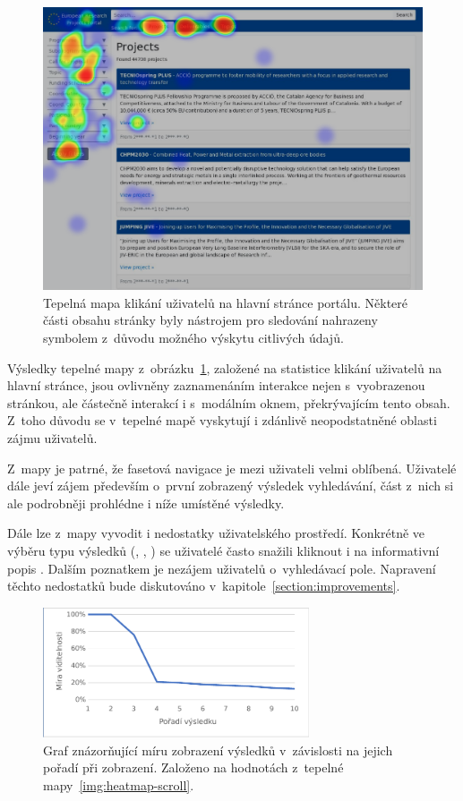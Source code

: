\begin{figure}[H]
	\centering
	\includegraphics[width=\textwidth]{obrazky-figures/heatmap.png}
	\caption{Tepelná mapa klikání uživatelů na hlavní stránce portálu. Některé části obsahu stránky byly nástrojem pro sledování nahrazeny symbolem \uv{*} z~důvodu možného výskytu citlivých údajů.}
	\label{img:heatmap}
\end{figure}

Výsledky tepelné mapy z~obrázku~\ref{img:heatmap}, založené na statistice klikání uživatelů na hlavní stránce, jsou ovlivněny zaznamenáním interakce nejen s~vyobrazenou stránkou, ale částečně interakcí i s~modálním oknem, překrývajícím tento obsah. Z~toho důvodu se v~tepelné mapě vyskytují i zdánlivě neopodstatněné oblasti zájmu uživatelů.

Z~mapy je patrné, že fasetová navigace je mezi uživateli velmi oblíbená. Uživatelé dále jeví zájem především o~první zobrazený výsledek vyhledávání, část z~nich si ale podrobněji prohlédne i níže umístěné výsledky.

Dále lze z~mapy vyvodit i nedostatky uživatelského prostředí. Konkrétně ve výběru typu výsledků (, , ) se uživatelé často snažili kliknout i na informativní popis . Dalším poznatkem je nezájem uživatelů o~vyhledávací pole. Napravení těchto nedostatků bude diskutováno v~kapitole~\ref{section:improvements}.

\begin{figure}[H]
	\centering
	\includegraphics[width=0.7\textwidth]{obrazky-figures/scroll-graph.pdf}
	\caption{Graf znázorňující míru zobrazení výsledků v~závislosti na jejich pořadí při zobrazení. Založeno na hodnotách z~tepelné mapy~\ref{img:heatmap-scroll}.}
	\label{img:scroll-graph}
\end{figure}

